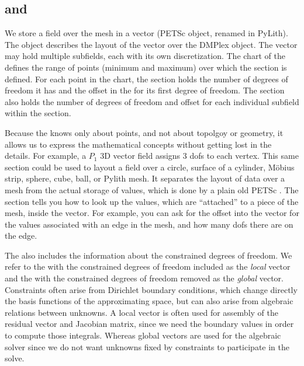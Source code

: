 \subsection{ and }
\label{sec:developer:petsc:section}

We store a field over the mesh in a vector (PETSc  object,
renamed  in PyLith). The  object
describes the layout of the vector over the DMPlex object. The vector
may hold multiple subfields, each with its own discretization. The
chart of the  defines the range of points
(minimum and maximum) over which the section is defined. For each
point in the chart, the section holds the number of degrees of freedom
it has and the offset in the  for its first degree of
freedom. The section also holds the number of degrees of freedom and
offset for each individual subfield within the section.

Because the  knows only about points, and not
about topolgoy or geometry, it allows us to express the mathematical
concepts without getting lost in the details. For example, a $P_1$ 3D
vector field assigns 3 dofs to each vertex. This same section could be
used to layout a field over a circle, surface of a cylinder, M\"obius
strip, sphere, cube, ball, or Pylith mesh. It separates the layout of
data over a mesh from the actual storage of values, which is done by a
plain old PETSc . The section tells you how to look up the
values, which are ``attached'' to a piece of the mesh, inside the
vector. For example, you can ask for the offset into the vector for
the values associated with an edge in the mesh, and how many dofs
there are on the edge.

The  also includes the information about the
constrained degrees of freedom. We refer to the  with
the constrained degrees of freedom included as the {\em local} vector
and the  with the constrained degrees of freedom
removed as the {\em global} vector. Constraints often arise from
Dirichlet boundary conditions, which change directly the basis
functions of the approximating space, but can also arise from
algebraic relations between unknowns. A local vector is often used for
assembly of the residual vector and Jacobian matrix, since we need the
boundary values in order to compute those integrals. Whereas global
vectors are used for the algebraic solver since we do not want
unknowns fixed by constraints to participate in the solve.

